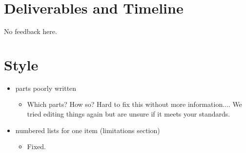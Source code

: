 \documentclass[11pt, a4paper]{article}
\begin{document}
\section*{Deliverables and Timeline}

No feedback here. 


\section*{Style}

\begin{itemize}
\item parts poorly written
\begin{itemize}
\item Which parts? How so? Hard to fix this without more information.... We tried editing things again but are unsure if it meets your standards. 
\end{itemize}
\item numbered lists for one item (limitations section) 
\begin{itemize}
\item Fixed. 
\end{itemize}
\end{itemize}
\end{document}
